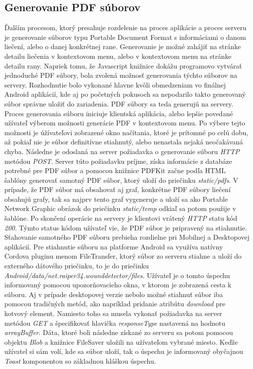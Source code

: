 \subsection{Generovanie PDF súborov}
Ďalším procesom, ktorý presahuje rozdelenie na proces aplikácie a proces serveru je generovanie súborov typu Portable Document Format s informáciami o danom liečení, alebo o danej konkrétnej rane. Generovanie je možné zahájiť na stránke detailu liečenia v kontextovom menu, alebo v kontextovom  menu na stránke detailu rany. Napriek tomu, že Javascript knižnice dokážu programovo vytvárať jednoduché PDF súbory, bola zvolená možnosť generovania týchto súborov na servery. Rozhodnutie bolo vykonané hlavne kvôli obmedzeniam vo finálnej Android aplikácií, kde aj po početných pokusoch sa nepodarilo takto generovaný súbor správne uložiť do zariadenia. PDF súbory sa teda generujú na servery. Proces generovania súboru iniciuje klientská aplikácia, alebo lepšie povedané užívateľ výberom možnosti generácie PDF v kontextovom menu. Po výbere tejto možnosti je úžívateľovi zobrazené okno načítania, ktoré je prítomné po celú dobu, až pokiaľ nie je súbor definitívne stiahnutý, alebo nenastala nejaká neočakávaná chyba. Následne je odoslaná na server požiadavka o generovanie súboru \textit{HTTP} metódou \textit{POST}. Server túto požiadavku príjme, získa informácie z databáze potrebné pre PDF súbor a pomocou knižnice PDFKit začne podľa HTML šablóny generovať samotný PDF súbor, ktorý uloží do priečinku \textit{static/pdfs}. V prípade, že PDF súbor má obsahovať aj graf, konkrétne PDF súbory liečení obsahujú grafy, tak sa najprv tento graf vygeneruje a uloží sa ako Portable Network Graphic obrázok do priečinku \textit{static/temp} odkiaľ sa potom použije v šablóne.  Po skončení operácie na servery je klientovi vrátený \textit{HTTP} statu kód \textit{200}. Týmto status kódom užívateľ vie, že PDF súbor je pripravený na stiahnutie. Sťahovanie samotného PDF súboru prebieha rozdielne pri Mobilnej a Desktopovej aplikácií. Pre stiahnutie súboru na platforme Android sa využíva natívny Cordova pluginu menom FileTransfer, ktorý súbor zo serveru stiahne a uloží do externého dátového priečinku, to je do priečinku \textit{Android/data/net.raiper34.wounddetector/files}. Užívateľ je o tomto úspechu informovaný pomocou upozorňovacieho okna, v ktorom je zobrazená cesta k súboru. Aj v prípade  desktopovej verzie nebolo možné stiahnuť súbor iba pomocou tradičných metód, ako napríklad pridanie atribútu \textit{download} pre kotvový element. Namiesto toho sa musela vykonať požiadavka na server metódou \textit{GET} a špecifikovať hlavička \textit{responseType} nastavená na hodnotu \textit{arrayBuffer}. Dáta, ktoré boli následne získané zo serveru sa potom pomocou  objektu \textit{Blob} a knižnice FileSaver uložili na užívateľom vybrané miesto. Keďže užívatel si sám volí, kde sa súbor uloží, tak o úspechu je informovaný obyčajnou \textit{Toast} komponentou so základnou hláškou úspechu.